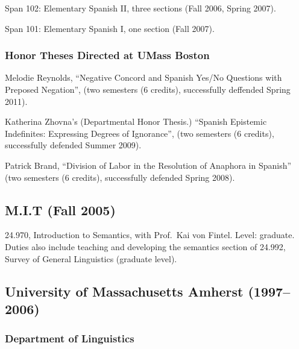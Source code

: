 \documentclass[11pt]{article}
\begin{document}
Span 102: Elementary Spanish II,  three sections (Fall 2006, Spring
2007).

Span 101: Elementary Spanish I, one section (Fall 2007).	

 \subsubsection*{Honor Theses Directed at UMass Boston}

 Melodie Reynolds, ``Negative Concord and
Spanish Yes/No Questions with Preposed Negation'', (two semesters (6
credits), successfully deffended Spring 2011).

 Katherina Zhovna's (Departmental Honor
  Thesis.)  ``Spanish Epistemic Indefinites: Expressing
  Degrees of Ignorance'', (two semesters (6 credits), successfully defended Summer 2009).

 Patrick Brand, ``Division of
  Labor in the Resolution of Anaphora in Spanish''  (two semesters (6 credits), successfully
  defended Spring 2008).





\subsection*{ M.I.T (Fall 2005)}

\textsc{24.970}, Introduction to Semantics, with Prof.\ Kai von
Fintel. Level: graduate. Duties also include teaching and developing
the semantics section of 24.992, Survey of General Linguistics
(graduate level).

\subsection*{University of Massachusetts Amherst (1997-- 2006)}

\subsubsection*{Department of Linguistics}
\end{document}
